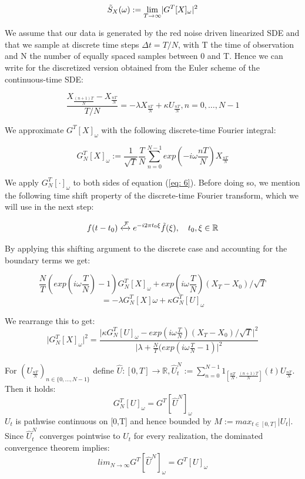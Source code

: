 \documentclass[%
thesis=student,%
coverpage=false,%
titlepage=false,%
headmarks=true, %
english,%
font=libertine, %
math=newpxtx, %
BCOR=5mm,%
coverBCOR=11mm%
]{tumbook}
\begin{document}
\[
    \Tilde{S}_{X}(\omega) := \lim_{T\rightarrow\infty} \lvert G^{T}[X]_{\omega}\rvert ^2
\]


We assume that our data is generated by the red noise driven linearized SDE and that we sample at discrete time steps $\Delta t = T/N$, with T the time of observation and N the number of equally spaced samples between 0 and T. Hence we can write for the discretized version obtained from the Euler scheme of the continuous-time SDE:

        \begin{equation}  
        \frac{X_{\frac{(n+1)T}{N}}-X_{\frac{nT}{N}}}{T/N} = -\lambda X_{\frac{nT}{N}} + \kappa U_{\frac{nT}{N}}, n = 0, \dots, N-1 \label{eq: 6}
        \end{equation}


We approximate $G^{T}[X]_{\omega}$ with the following discrete-time Fourier integral:

    \[
    G_{N}^{T}[X]_{\omega}:= \frac{1}{\sqrt{T}}\frac{T}{N}\sum_{n=0}^{N-1}exp(-i\omega\frac{nT}{N})X_{\frac{nT}{N}}
    \]


We apply $G_{N}^{T}[\cdot]_{\omega}$ to both sides of equation (\ref{eq: 6}). Before doing so, we mention the following time shift property of the discrete-time Fourier transform, which we will use in the next step:

\[
f(t-t_{0}) \xleftrightarrow{\mathcal{F}} e^{-i2\pi t_{0}\xi}\Tilde{f}(\xi), \ \ \ t_{0},\xi \in \mathbb{R}
\]

By applying this shifting argument to the discrete case and accounting for the boundary terms we get: 
        
    \[
    \frac{N}{T}(exp(i\omega\frac{T}{N})-1)G_{N}^{T}[X]_{\omega} + exp(i\omega\frac{T}{N})(X_{T}-X_{0})/\sqrt{T} 
    \]
    \[
    = -\lambda G_{N}^{T}[X]\omega + \kappa G_{N}^{T}[U]_{\omega}
    \]


We rearrange this to get:
    \[
    \lvert G_{N}^{T}[X]_{\omega}\rvert ^2 = \frac{\lvert \kappa G_{N}^{T}[U]_{\omega} - exp(i\omega\frac{T}{N})(X_{T}-X_{0})/\sqrt{T}\rvert ^2}{\lvert \lambda + \frac{N}{T}(exp(i\omega\frac{T}{N} - 1)\rvert^2}
    \]

For $(U_{\frac{nT}{N}})_{n \in \{0,...,N-1\}}$ define $\hat{U}:[0,T]\rightarrow\mathbb{R}, \hat{U}_{t}^{N} := \sum_{n=0}^{N-1}1_{[\frac{nT}{N},\frac{(n+1)T}{N}]}(t)U_{\frac{nT}{N}}$. Then it holds:
\[
G_{N}^{T}[U]_{\omega} = G^{T}[\hat{U}^{N}]_{\omega}
\]
$U_{t}$ is pathwise continuous on [0,T] and hence bounded by $M := max_{t\in [0,T]} \lvert U_{t} \rvert$. Since $\hat{U}_{t}^{N}$ converges pointwise to $U_{t}$ for every realization, the dominated convergence theorem implies:
\[
lim_{N\rightarrow\infty}G^{T}[\hat{U}^{N}]_{\omega} = G^{T}[U]_{\omega}
\]
\end{document}
